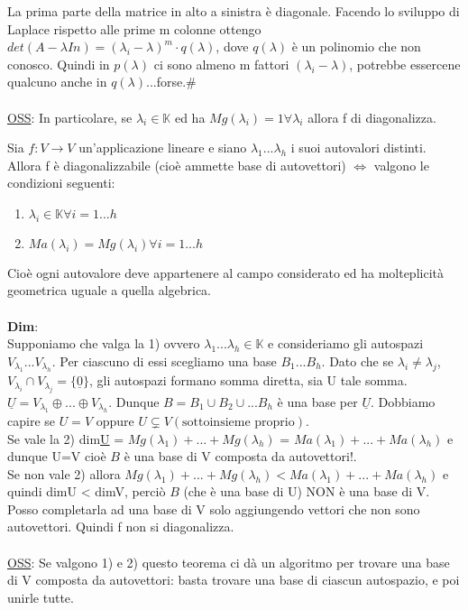 \documentclass[12pt]{article}
\begin{document}
La prima parte della matrice in alto a sinistra è diagonale. Facendo lo sviluppo di Laplace rispetto alle prime m colonne ottengo $det(A-\lambda In) = (\lambda_i-\lambda)^m\cdot q(\lambda)$, dove $q(\lambda)$ è un polinomio che non conosco. Quindi in $p(\lambda)$ ci sono almeno m fattori $(\lambda_i -\lambda)$, potrebbe essercene qualcuno anche in $q(\lambda)$...forse.\#\\\\
\underline{OSS}: In particolare, se $\lambda_i \in \mathbb{K}$ ed ha $Mg(\lambda_i) = 1 \forall \lambda_i$
allora f di diagonalizza.
\begin{theorem}
    Sia $f: V\longrightarrow V$ un'applicazione lineare e siano $\lambda_1...\lambda_h$ i suoi autovalori distinti. Allora f è diagonalizzabile (cioè ammette base di autovettori) $\iff$ valgono le condizioni seguenti:
    \begin{enumerate}
        \item $\lambda_i \in \mathbb{K} \forall i=1...h$
        \item $Ma(\lambda_i) = Mg(\lambda_i) \forall i=1...h$
    \end{enumerate}
    
\end{theorem}
Cioè ogni autovalore deve appartenere al campo considerato ed ha molteplicità geometrica uguale a quella algebrica.\\\\
\textbf{Dim}:\\
Supponiamo che valga la 1) ovvero $\lambda_1...\lambda_h \in \mathbb{K}$ e consideriamo gli autospazi $V_{\lambda_1}...V_{\lambda_h}$. Per ciascuno di essi scegliamo una base $B_1...B_h$. Dato che se $\lambda_i \neq \lambda_j$, $V_{\lambda_i} \cap V_{\lambda_j} = \{\underline{0}\}$, gli autospazi formano somma diretta, sia U tale somma. $\underline{U} = V_{\lambda_1} \oplus... \oplus V_{\lambda_h}$. Dunque $B = B_1 \cup B_2 \cup... B_h$ è una base per $\underline{U}$. Dobbiamo capire se $U = V$ oppure $U \subsetneq V (\text{sottoinsieme proprio})$.\\
Se vale la 2) dim\underline{U} = $Mg(\lambda_1)+...+Mg(\lambda_h)$ = $Ma(\lambda_1)+...+Ma(\lambda_h)$ e dunque U=V cioè $B$ è una base di V composta da autovettori!.\\
Se non vale 2) allora $Mg(\lambda_1)+...+Mg(\lambda_h) < Ma(\lambda_1)+...+Ma(\lambda_h)$ e quindi dimU < dimV, perciò $B$ (che è una base di U) NON è una base di V. Posso completarla ad una base di V solo aggiungendo vettori che non sono autovettori. Quindi f non si diagonalizza.\\\\
\underline{OSS}: Se valgono 1) e 2) questo teorema ci dà un algoritmo per trovare una base di V composta da autovettori: basta trovare una base di ciascun autospazio, e poi unirle tutte.
\end{document}
